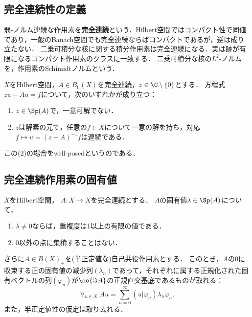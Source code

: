 \documentclass[uplatex,dvipdfmx]{jsreport}
\begin{document}
\subsection{完全連続性の定義}

\begin{definition}
    弱-ノルム連続な作用素を\textbf{完全連続}という．Hilbert空間ではコンパクト性で同値であり，一般のBanach空間でも完全連続ならばコンパクトであるが，逆は成り立たない．
    二乗可積分な核に関する積分作用素は完全連続になる．実は跡が有限になるコンパクト作用素のクラスに一致する．
    二乗可積分な核の$L^2$-ノルムを，作用素のSchimidtノルムという．
\end{definition}

\begin{theorem}
    $X$をHilbert空間，$A\in B_0(X)$を完全連続，$z\in\C\setminus\{0\}$とする．
    方程式$zu-Au=f$について，次のいずれかが成り立つ：
    \begin{enumerate}
        \item $z\in\Sp(A)$で，一意可解でない．
        \item $z$は解素の元で，任意の$f\in X$について一意の解を持ち，対応$f\mapsto u=(z-A)^{-1}f$は連続である．
    \end{enumerate}
    この(2)の場合をwell-posedというのである．
\end{theorem}

\subsection{完全連続作用素の固有値}

\begin{theorem}
    $X$をHilbert空間，
    $A:X\to X$を完全連続とする．
    $A$の固有値$\lambda\in\Sp(A)$について，
    \begin{enumerate}
        \item $\lambda\ne0$ならば，重複度は1以上の有限の値である．
        \item $0$以外の点に集積することはない．
    \end{enumerate}
\end{theorem}

\begin{theorem}
    さらに$A\in B(X)_+$を(半正定値な)自己共役作用素とする．
    このとき，$A$の$0$に収束する正の固有値の減少列$(\lambda_n)$であって，それぞれに属する正規化された固有ベクトルの列$(\varphi_n)$が$\oo{\Im A}$の正規直交基底であるものが取れる：
    \[\forall_{u\in X}\;Au=\sum_{n=0}^\infty(u|\varphi_n)\lambda_n\varphi_n.\]
    また，半正定値性の仮定は取り去れる．
\end{theorem}
\end{document}
